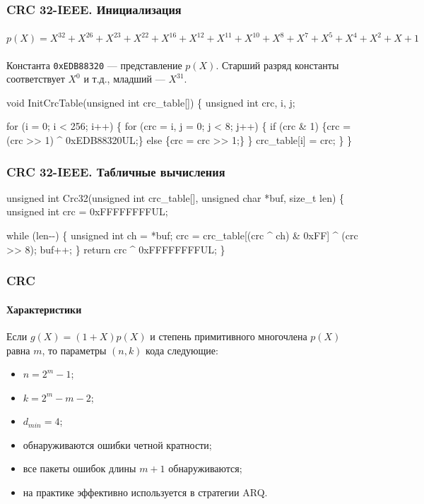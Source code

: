 \begin{frame}[fragile]
    \frametitle{CRC 32-IEEE. Инициализация}
    \framesubtitle{
        \(
            p(X)=
            X^{32} + X^{26} + X^{23} + X^{22} + 
            X^{16} + X^{12} + X^{11} + X^{10} +
            X^8    + X^7    + X^5    + X^4    +
            X^2    + X      + 1
        \)
    }
    
    Константа \verb"0xEDB88320" --- представление $p(X)$. Старший разряд константы соответствует $X^0$ и т.д., младший --- $X^{31}$.
\begin{semiverbatim}    
void InitCrcTable(unsigned int \alert{crc_table}[]) \{
    unsigned int crc, i, j;
 
    for (i = 0; i < 256; i++) \{
        for (crc = i, j = 0; j < 8; j++) \{
            if (crc & 1) \{crc = (crc {>}> 1) ^ 0xEDB88320UL;\}
            else         \{crc = crc {>}> 1;\}
        \}
        \alert{crc_table}[i] = crc;
    \}
\}
\end{semiverbatim}    
\end{frame}

\begin{frame}[fragile]
    \frametitle{CRC 32-IEEE. Табличные вычисления}
    
\begin{semiverbatim}    
unsigned int Crc32(unsigned int \alert{crc_table}[], 
                   unsigned char *buf, size_t len) \{
    unsigned int crc = 0xFFFFFFFFUL;
    
    while (len{-}-) \{
        unsigned int ch = *buf;
        crc = \alert{crc_table[}(crc ^ ch) & 0xFF\alert{]} ^ (crc {>}> 8);
        buf++;
    \}
    return crc ^ 0xFFFFFFFFUL;
\}
\end{semiverbatim}    
\end{frame}

\begin{frame}
    \frametitle{CRC}
    \framesubtitle{Характеристики}
    
    Если $g(X)=(1+X)p(X)$ и степень \alert{примитивного} многочлена $p(X)$ равна $m$, то параметры $(n,k)$ кода следующие:
    \begin{itemize}
        \item $n=2^m-1$;
        \item $k=2^m-m-2$;
        \item $d_{min}=4$;
        \item обнаруживаются ошибки четной кратности;
        \item все пакеты ошибок длины $m+1$ обнаруживаются;
        \item на практике эффективно используется в стратегии ARQ.
    \end{itemize}
\end{frame}


